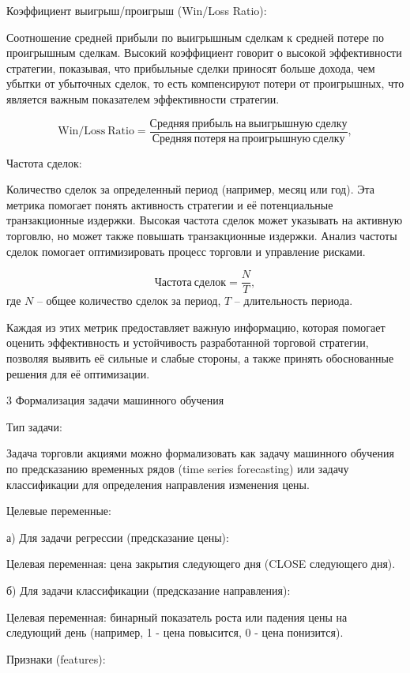 Коэффициент выигрыш/проигрыш (Win/Loss Ratio):

Соотношение средней прибыли по выигрышным сделкам к средней потере по проигрышным сделкам. Высокий коэффициент говорит о высокой эффективности стратегии, показывая, что прибыльные сделки приносят больше дохода, чем убытки от убыточных сделок, то есть компенсируют потери от проигрышных, что является важным показателем эффективности стратегии.

\[
\mathrm{Win/Loss\ Ratio} = \frac{\mathrm{Средняя\ прибыль\ на\ выигрышную\ сделку}}{\mathrm{Средняя\ потеря\ на\ проигрышную\ сделку}},
\]

Частота сделок:

Количество сделок за определенный период (например, месяц или год). Эта метрика помогает понять активность стратегии и её потенциальные транзакционные издержки. Высокая частота сделок может указывать на активную торговлю, но может также повышать транзакционные издержки. Анализ частоты сделок помогает оптимизировать процесс торговли и управление рисками.

\[
\mathrm{Частота\ сделок} = \frac{N}{T},
\]
где \(N\) – общее количество сделок за период, \(T\) – длительность периода.

Каждая из этих метрик предоставляет важную информацию, которая помогает оценить эффективность и устойчивость разработанной торговой стратегии, позволяя выявить её сильные и слабые стороны, а также принять обоснованные решения для её оптимизации.

\newpage
{}
3 Формализация задачи машинного обучения

Тип задачи:

Задача торговли акциями можно формализовать как задачу машинного обучения по предсказанию временных рядов (time series
forecasting) или задачу классификации для определения направления изменения цены.

Целевые переменные:

а) Для задачи регрессии (предсказание цены):

Целевая переменная: цена закрытия следующего дня (CLOSE следующего дня).

б) Для задачи классификации (предсказание направления):

Целевая переменная: бинарный показатель роста или падения цены на следующий день (например, 1 - цена повысится, 0 - цена
понизится).

Признаки (features):

